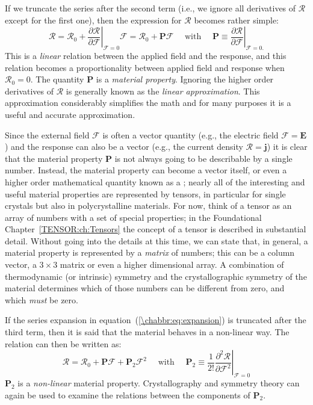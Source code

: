 If we truncate the series after the second term (i.e., we ignore all derivatives of $\mathcal{R}$ except for the first one), then the expression for $\mathcal{R}$ becomes rather simple:
\begin{equation}
	\mathcal{R}=\mathcal{R}_0 + 
	\left.\frac{\partial\mathcal{R}}{\partial\mathcal{F}}\right 
	\vert_{\mathcal{F}=0}\!\!\!\!\mathcal{F} =\mathcal{R}_0 + 
	\mathbf{P}\mathcal{F}\quad\mbox{ with }\quad \mathbf{P}\equiv\left.  
	\frac{\partial\mathcal{R}}{\partial\mathcal{F}}\right\vert_{\mathcal{F}=0.
	}
\end{equation}
This is a \textit{linear} relation between the applied field and the response, and this relation becomes a proportionality between applied field and response when $\mathcal{R}_0=0$.  The quantity $\mathbf{P}$ is a \textit{material property}.  Ignoring the higher order derivatives of $\mathcal{R}$ is generally known as the \textit{linear approximation}.  This approximation considerably simplifies the math and for many purposes it is a useful and accurate approximation.

Since the external field $\mathcal{F}$ is often a vector quantity (e.g., the electric field $\mathcal{F}=\mathbf{E}$) and the response can also be a vector (e.g., the current density $\mathcal{R}=\mathbf{j}$) it is clear that the material property $\mathbf{P}$ is not always going to be describable by a single number.  Instead, the material property can become a vector itself, or even a higher order mathematical quantity known as a ; nearly all of the interesting and useful material properties are represented by tensors, in particular for single crystals but also in polycrystalline materials.  For now, think of a tensor as an array of numbers with a set of special properties; in the Foundational Chapter~\ref{TENSOR:ch:Tensors} the concept of a tensor is described in substantial detail.  Without going into the details at this time, we can state that, in general, a material property is represented by a \textit{matrix} of numbers; this can be a column vector, a $3\times 3$ matrix or even a higher dimensional array.  A combination of thermodynamic (or intrinsic) symmetry and the crystallographic symmetry of the material determines which of those numbers can be different from zero, and which \textit{must} be zero.  

If the series expansion in equation~(\ref{\chabbr:eq:expansion}) is truncated after the third term, then it is said that the material behaves in a non-linear way.  The relation can then be written as:
\begin{equation}
	\mathcal{R}=\mathcal{R}_0 + \mathbf{P}\mathcal{F} + 
	\mathbf{P}_2\mathcal{F}^2\quad\mbox{ with }\quad \mathbf{P}_2\equiv\frac{1}{2!}\left.\frac{\partial^2\mathcal{R}}{\partial\mathcal{F}^2}\right 
	\vert_{\mathcal{F}=0}
\end{equation}
$\mathbf{P}_2$ is a \textit{non-linear} material property.  Crystallography and symmetry theory can again be used to examine the relations between the components of $\mathbf{P}_2$.  
	
